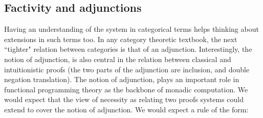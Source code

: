 \subsection {Factivity and adjunctions}
Having an understanding of the system in categorical terms helps 
thinking about extensions in such terms too. In any category theoretic
textbook, the next ``tighter" relation between categories is that of an adjunction.
Interestingly, the notion of adjunction, is also central in the relation
between classical and intuitionistic proofs (the two parts of the adjunction
are inclusion, and double negation translation).  The notion of adjunction, plays
an important role in functional programming theory as the backbone 
of monadic computation. 
We would expect that the view of necessity as 
relating two proofs systems could extend to cover the notion of adjunction.
We would expect a rule of the form:




